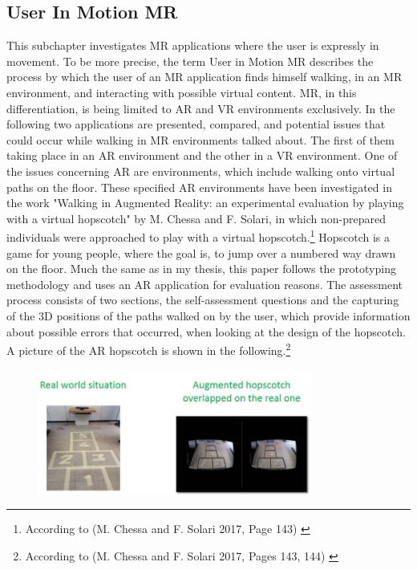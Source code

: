 \documentclass[12pt,a4paper,oneside,american,parskip=half]{article}
\begin{document}
\begin{justify}
\begin{normalsize}
\subsection{User In Motion MR}
This subchapter investigates MR applications where the user is expressly in movement.
To be more precise, the term User in Motion MR describes the process by which the user of an MR application finds himself walking, in an MR environment, and interacting with possible virtual content.
MR, in this differentiation, is being limited to AR and VR environments exclusively. In the following two applications are presented, compared, and potential issues that could occur while walking in MR environments talked about. The first of them taking place in an AR environment and the other in a VR environment.
\newline
\newline
One of the issues concerning AR are environments, which include walking onto virtual paths on the floor. 
These specified AR environments have been investigated in the work "Walking in Augmented Reality: an experimental evaluation by playing with a virtual hopscotch" by M. Chessa and F. Solari, in which non-prepared individuals were approached to play with a virtual hopscotch.\footnote{According to (M. Chessa and F. Solari 2017, Page 143) \cite{arhopscotch}}
\newline
Hopscotch is a game for young people, where the goal is, to jump over a numbered way drawn on the floor.
Much the same as in my thesis, this paper follows the prototyping methodology and uses an AR application for evaluation reasons. The assessment process consists of two sections, the self-assessment questions and the capturing of the 3D positions of the paths walked on by the user, which provide information about possible errors that occurred, when looking at the design of the hopscotch.
A picture of the AR hopscotch is shown in the following.\footnote{According to (M. Chessa and F. Solari 2017, Pages 143, 144) \cite{arhopscotch}}
\begin{figure}[h!]
\centering
\includegraphics[width=9cm]{hopscotch.png}

\end{figure}
\end{normalsize}
\end{justify}
\end{document}
